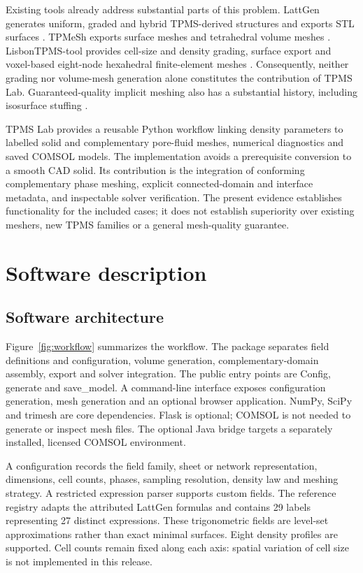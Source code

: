 \documentclass[preprint,12pt,a4paper]{elsarticle}
\begin{document}
Existing tools already address substantial parts of this problem. LattGen generates uniform, graded and hybrid TPMS-derived structures and exports STL surfaces \cite{lattgen}. TPMeSh exports surface meshes and tetrahedral volume meshes \cite{tpmesh}. LisbonTPMS-tool provides cell-size and density grading, surface export and voxel-based eight-node hexahedral finite-element meshes \cite{lisbon}. Consequently, neither grading nor volume-mesh generation alone constitutes the contribution of TPMS Lab. Guaranteed-quality implicit meshing also has a substantial history, including isosurface stuffing \cite{stuffing}.

TPMS Lab provides a reusable Python workflow linking density parameters to labelled solid and complementary pore-fluid meshes, numerical diagnostics and saved COMSOL models. The implementation avoids a prerequisite conversion to a smooth CAD solid. Its contribution is the integration of conforming complementary phase meshing, explicit connected-domain and interface metadata, and inspectable solver verification. The present evidence establishes functionality for the included cases; it does not establish superiority over existing meshers, new TPMS families or a general mesh-quality guarantee.

\FloatBarrier
\section{Software description}

\subsection{Software architecture}

Figure~\ref{fig:workflow} summarizes the workflow. The package separates field definitions and configuration, volume generation, complementary-domain assembly, export and solver integration. The public entry points are Config, generate and save\_model. A command-line interface exposes configuration generation, mesh generation and an optional browser application. NumPy, SciPy and trimesh are core dependencies. Flask is optional; COMSOL is not needed to generate or inspect mesh files. The optional Java bridge targets a separately installed, licensed COMSOL environment.

A configuration records the field family, sheet or network representation, dimensions, cell counts, phases, sampling resolution, density law and meshing strategy. A restricted expression parser supports custom fields. The reference registry adapts the attributed LattGen formulas and contains 29 labels representing 27 distinct expressions. These trigonometric fields are level-set approximations rather than exact minimal surfaces. Eight density profiles are supported. Cell counts remain fixed along each axis: spatial variation of cell size is not implemented in this release.
\end{document}
